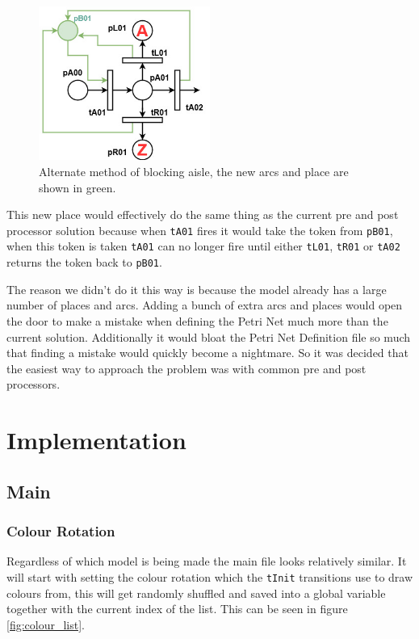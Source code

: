 \documentclass[english]{article}
\begin{document}
\begin{figure}[H]
    \centering
    \includegraphics[width=0.5\textwidth]{figures/aircraft-zoom-alt.jpg}
    \caption{Alternate method of blocking aisle, the new arcs and place are shown in green.}
    \label{fig:aisle_block_alt}
\end{figure}

This new place would effectively do the same thing as the current pre and post processor solution because when \lstinline{tA01} fires it would take the token from \lstinline{pB01}, when this token is taken \lstinline{tA01} can no longer fire until either \lstinline{tL01}, \lstinline{tR01} or \lstinline{tA02} returns the token back to \lstinline{pB01}. 

The reason we didn't do it this way is because the model already has a large number of places and arcs. Adding a bunch of extra arcs and places would open the door to make a mistake when defining the Petri Net much more than the current solution. Additionally it would bloat the Petri Net Definition file so much that finding a mistake would quickly become a nightmare. So it was decided that the easiest way to approach the problem was with common pre and post processors. 


\section{Implementation}
\subsection{Main}
\subsubsection{Colour Rotation}
Regardless of which model is being made the main file looks relatively similar. It will start with setting the colour rotation which the \lstinline{tInit} transitions use to draw colours from, this will get randomly shuffled and saved into a global variable together with the current index of the list. This can be seen in figure \ref{fig:colour_list}.
\end{document}
